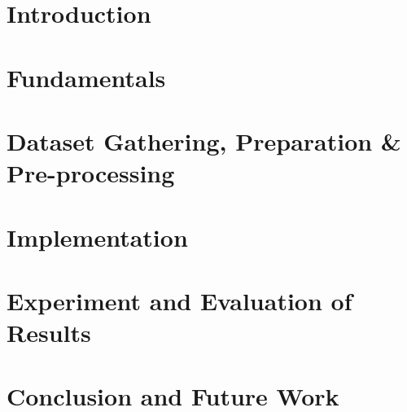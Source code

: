 \documentclass[12pt,a4paper]{report}
\begin{document}






\tableofcontents
\listoffigures
\listoftables
\listoflistings
\newpage
{}

\chapter{Introduction}
\label{chap:1}


\chapter{Fundamentals}
\label{chap:2}


\chapter{Dataset Gathering, Preparation \& Pre-processing}
\label{chap:3}


\chapter{Implementation}
\label{chap:4}


\chapter{Experiment and Evaluation of Results}
\label{chap:5}


\chapter{Conclusion and Future Work}
\label{chap:6}


% 


\end{document}
